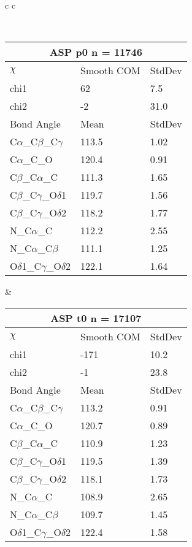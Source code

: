 \begin{longtable}{ c c }

\caption{ASP Central Values}\\
  \begin{tabular}{ l l l }
  \toprule
  \multicolumn{3}{c}{ASP \textbf{p0} n = 11746} \\ \toprule
  $\chi$       & Smooth COM & StdDev \\ \midrule
  chi1 & 62 & 7.5 \\ 
  chi2 & -2 & 31.0 \\ \midrule
  Bond Angle   & Mean     & StdDev \\ \midrule
  C$\alpha$\_C$\beta$\_C$\gamma$ & 113.5 & 1.02\\
  C$\alpha$\_C\_O & 120.4 & 0.91\\
  C$\beta$\_C$\alpha$\_C & 111.3 & 1.65\\
  C$\beta$\_C$\gamma$\_O$\delta$1 & 119.7 & 1.56\\
  C$\beta$\_C$\gamma$\_O$\delta$2 & 118.2 & 1.77\\
  N\_C$\alpha$\_C & 112.2 & 2.55\\
  N\_C$\alpha$\_C$\beta$ & 111.1 & 1.25\\
  O$\delta$1\_C$\gamma$\_O$\delta$2 & 122.1 & 1.64\\
  \bottomrule
  \end{tabular}
  &
  \begin{tabular}{ l l l }
  \toprule
  \multicolumn{3}{c}{ASP \textbf{t0} n = 17107} \\ \toprule
  $\chi$       & Smooth COM & StdDev \\ \midrule
  chi1 & -171 & 10.2 \\ 
  chi2 & -1 & 23.8 \\ \midrule
  Bond Angle   & Mean     & StdDev \\ \midrule
  C$\alpha$\_C$\beta$\_C$\gamma$ & 113.2 & 0.91\\
  C$\alpha$\_C\_O & 120.7 & 0.89\\
  C$\beta$\_C$\alpha$\_C & 110.9 & 1.23\\
  C$\beta$\_C$\gamma$\_O$\delta$1 & 119.5 & 1.39\\
  C$\beta$\_C$\gamma$\_O$\delta$2 & 118.1 & 1.73\\
  N\_C$\alpha$\_C & 108.9 & 2.65\\
  N\_C$\alpha$\_C$\beta$ & 109.7 & 1.45\\
  O$\delta$1\_C$\gamma$\_O$\delta$2 & 122.4 & 1.58\\
  \bottomrule

\end{tabular}
\end{longtable}
